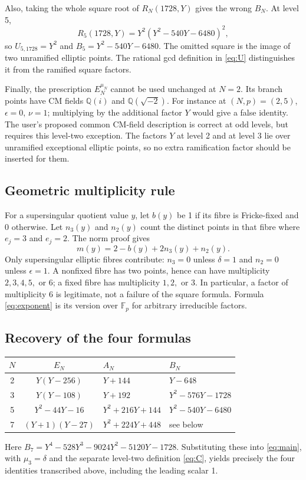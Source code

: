 \documentclass[11pt,a4paper]{article}
\begin{document}
Also, taking the whole square root of $R_N(1728,Y)$ gives the wrong $B_N$. At level 5,
\[
 R_5(1728,Y)=Y^2(Y^2-540Y-6480)^2,
\]
so $U_{5,1728}=Y^2$ and $B_5=Y^2-540Y-6480$. The omitted square is the image of two unramified elliptic points. The rational gcd definition in \eqref{eq:U} distinguishes it from the ramified square factors.

Finally, the prescription $E_N^{\mu_N}$ cannot be used unchanged at $N=2$. Its branch points have CM fields $\mathbb Q(i)$ and $\mathbb Q(\sqrt{-2})$. For instance at $(N,p)=(2,5)$, $\epsilon=0$, $\nu=1$; multiplying by the additional factor $Y$ would give a false identity. The user's proposed common CM-field description is correct at odd levels, but requires this level-two exception. The factors $Y$ at level 2 and at level 3 lie over unramified exceptional elliptic points, so no extra ramification factor should be inserted for them.

\subsection{Geometric multiplicity rule}
For a supersingular quotient value $y$, let $b(y)$ be 1 if its fibre is Fricke-fixed and 0 otherwise. Let $n_3(y)$ and $n_2(y)$ count the distinct points in that fibre where $e_j=3$ and $e_j=2$. The norm proof gives
\[
 m(y)=2-b(y)+2n_3(y)+n_2(y).
\]
Only supersingular elliptic fibres contribute: $n_3=0$ unless $\delta=1$ and $n_2=0$ unless $\epsilon=1$. A nonfixed fibre has two points, hence can have multiplicity $2,3,4,5,$ or $6$; a fixed fibre has multiplicity $1,2,$ or $3$. In particular, a factor of multiplicity 6 is legitimate, not a failure of the square formula. Formula \eqref{eq:exponent} is its version over $\mathbb F_p$ for arbitrary irreducible factors.

\subsection{Recovery of the four formulas}
\begin{center}\small
\begin{tabular}{ccll}
\toprule
$N$ & $E_N$ & $A_N$ & $B_N$\\
\midrule
2 & $Y(Y-256)$ & $Y+144$ & $Y-648$\\
3 & $Y(Y-108)$ & $Y+192$ & $Y^2-576Y-1728$\\
5 & $Y^2-44Y-16$ & $Y^2+216Y+144$ & $Y^2-540Y-6480$\\
7 & $(Y+1)(Y-27)$ & $Y^2+224Y+448$ & see below\\
\bottomrule
\end{tabular}\end{center}
Here $B_7=Y^4-528Y^3-9024Y^2-5120Y-1728$. Substituting these into \eqref{eq:main}, with $\mu_3=\delta$ and the separate level-two definition \eqref{eq:C}, yields precisely the four identities transcribed above, including the leading scalar 1.
\end{document}
